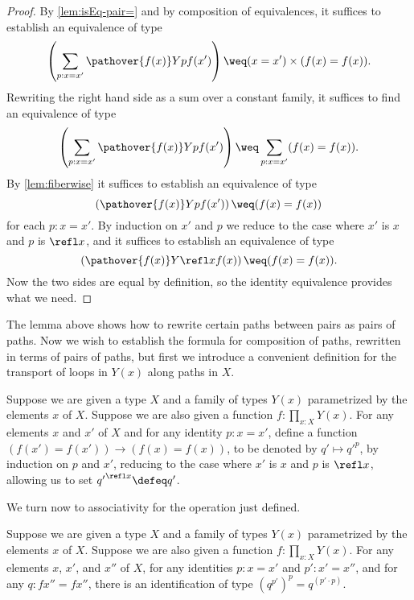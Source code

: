 \begin{proof}
  By \cref{lem:isEq-pair=} and by composition of equivalences, it suffices to establish an equivalence of type
  $$\left( \sum_{p:x=x'} \pathover {f(x)} Y p {f(x')} \right) \weq (x=x') \times (f(x) = f(x)).$$
  Rewriting the right hand side as a sum over a constant family, it suffices to find an equivalence of type
  $$\left( \sum_{p:x=x'} \pathover {f(x)} Y p {f(x')} \right) \weq \sum_{p:x=x'} (f(x) = f(x)).$$
  By \cref{lem:fiberwise} it suffices to establish an equivalence of type
  $$ \left( \pathover {f(x)} Y p {f(x')} \right) \weq (f(x) = f(x))$$
  for each $p:x=x'$.  By induction on $x'$ and $p$ we reduce to the case where $x'$ is $x$ and $p$ is $\refl x$, and it suffices to establish an
  equivalence of type
  $$ \left( \pathover {f(x)} Y {\refl x} {f(x)} \right) \weq (f(x) = f(x)).$$
  Now the two sides are equal by definition, so the identity equivalence provides what we need.
\end{proof}

The lemma above shows how to rewrite certain paths between pairs as pairs of paths.  Now we wish to establish the formula for composition of
paths, rewritten in terms of pairs of paths, but first we introduce a convenient definition for the transport of loops in $Y(x)$ along paths in
$X$.

\begin{definition}\label{def:pathsectionaction}
  Suppose we are given a type $X$ and a family of types $Y(x)$ parametrized by the elements $x$ of $X$.
  Suppose we are also given a function $f : \prod_{x:X} Y(x)$.
  For any elements $x$ and $x'$ of $X$ and for any identity $p : x = x'$, define a function $(f(x') = f(x')) \to (f(x) = f(x))$, to be denoted
  by $q' \mapsto {q'} ^ p$, by induction on $p$ and $x'$, reducing to the case where $x'$ is $x$ and $p$ is $\refl x$, allowing us to
  set ${q'} ^{ \refl x } \defeq q'$.
\end{definition}

We turn now to associativity for the operation just defined.

\begin{lemma}\label{def:pathsectionactionassoc}
  Suppose we are given a type $X$ and a family of types $Y(x)$ parametrized by the elements $x$ of $X$.
  Suppose we are also given a function $f : \prod_{x:X} Y(x)$.
  For any elements $x$, $x'$, and $x''$ of $X$, for any identities $p : x = x'$ and $p' : x' = x''$,
  and for any $q : f x'' = f x''$,
  there is an identification of type $ ( q ^{ p' }) ^ p = q ^{( p' \cdot p )}$.
\end{lemma}

